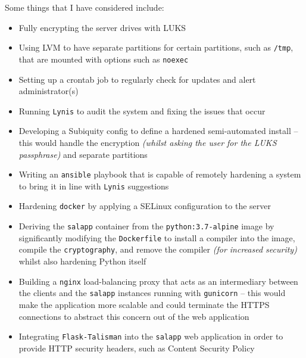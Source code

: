 Some things that I have considered include:
\begin{itemize}
  \item Fully encrypting the server drives with LUKS
  \item Using LVM to have separate partitions for certain partitions, such as \texttt{/tmp}, that are mounted with options such as \texttt{noexec}
  \item Setting up a crontab job to regularly check for updates and alert administrator(s)
  \item Running \texttt{Lynis} to audit the system and fixing the issues that occur
  \item Developing a Subiquity config to define a hardened semi-automated install -- this would handle the encryption \textit{(whilst asking the user for the LUKS passphrase)} and separate partitions
  \item Writing an \texttt{ansible} playbook that is capable of remotely hardening a system to bring it in line with \texttt{Lynis} suggestions
  \item Hardening \texttt{docker} by applying a SELinux configuration to the server
  \item Deriving the \texttt{salapp} container from the \texttt{python:3.7-alpine} image by significantly modifying the \texttt{Dockerfile} to install a compiler into the image, compile the \texttt{cryptography}, and remove the compiler \textit{(for increased security)} whilst also hardening Python itself
  \item Building a \texttt{nginx} load-balancing proxy that acts as an intermediary between the clients and the \texttt{salapp} instances running with \texttt{gunicorn} -- this would make the application more scalable and could terminate the HTTPS connections to abstract this concern out of the web application
  \item Integrating \texttt{Flask-Talisman} into the \texttt{salapp} web application in order to provide HTTP security headers, such as Content Security Policy
\end{itemize}
